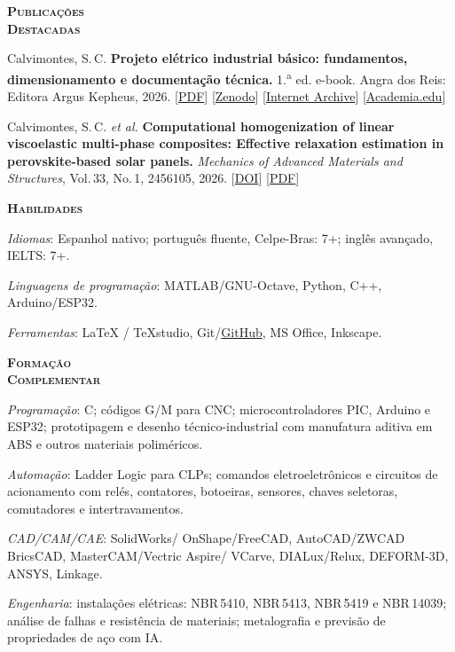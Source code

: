 \documentclass[a4paper, 10pt]{article}
\newcommand{\Calluna}{\rmfamily}
\newcommand{\Courier}{\ttfamily}
\newlength{\lblwidth}
\newcommand{\sectionBlock}[2]{%
	\par\addvspace{3pt}%
	\noindent%
	\begin{mdframed}[style=cvbox]%
		\noindent%
		\begin{minipage}[t]{\lblwidth}%
			\vspace{0pt}%
			\setstretch{1.0}%
			\raggedright%
			\small\scshape\Calluna%
			#1%
		\end{minipage}%
		\hspace{6pt}%
		\begin{minipage}[t]{\dimexpr\linewidth-\lblwidth-6pt\relax}%
			\vspace{0pt}%
			\setlength{\parindent}{0pt}%
			\setlength{\parskip}{2pt}%
			#2%
		\end{minipage}%
	\end{mdframed}%
	\par\addvspace{1pt}%
}
\renewcommand{\section}[1]{%
	{\small\bfseries\scshape #1}%
}
\newcommand{\cvBlock}{%
	\justifying%
	\setlength{\parindent}{0pt}%
	\setlength{\parskip}{2pt}%
	\noindent\ignorespaces%
}
\newcommand{\cvLine}[1]{%
	\noindent #1\par\vspace{1pt}%
}
\begin{document}
	\sectionBlock{
		\section{Publicações\\[2pt]Destacadas}
	}{
		\cvBlock
		
		\cvLine{Calvimontes, S.\,C.
			\textbf{Projeto elétrico industrial básico: fundamentos, dimensionamento e documentação técnica.}
			1.\textsuperscript{a} ed. e-book.
			Angra dos Reis: Editora Argus Kepheus, 2026.
			[\href{https://drive.google.com/file/d/1j6KBMzZnQOnWV1OI968__dmG1RZcZ-Jl/view?usp=sharing}{PDF}]
			[\href{https://zenodo.org/records/20804262}{Zenodo}]
			[\href{https://archive.org/details/calvimontes-s.-c.-projeto-eletrico-fundamentos-dimensionamento-e-documentacao-tecnica-2026-1ed-182p}{Internet Archive}]
			[\href{https://www.academia.edu/169042224/Projeto_el\%C3\%A9trico_industrial_b\%C3\%A1sico}{Academia.edu}]}
		
		\cvLine{Calvimontes, S.\,C. \textit{et al.}
			\textbf{Computational homogenization of linear viscoelastic multi-phase composites:
				Effective relaxation estimation in perovskite-based solar panels.}
			\emph{Mechanics of Advanced Materials and Structures},
			Vol.\,33, No.\,1, 2456105, 2026.
			[\href{https://doi.org/10.1080/15376494.2025.2456105}{DOI}]
			[\href{https://drive.google.com/file/d/1LJM0_6I7H_WkGn2Orc6aN3Xmn1YhA52J/view?usp=sharing}{PDF}]}
	}
	
	\sectionBlock{
		\section{Habilidades}
	}{
		\cvBlock
		\cvLine{\emph{Idiomas}: Espanhol nativo; português fluente, Celpe-Bras: 7+; inglês avançado, IELTS: 7+.}
		\cvLine{\emph{Linguagens de programação}: {\Courier MATLAB/GNU-Octave, Python, C++, Arduino/ESP32}.}
		\cvLine{\emph{Ferramentas}: \LaTeX{} / TeXstudio, Git/\href{https://github.com/Argus-Kepheus}{GitHub}, MS Office, Inkscape.}
	}
	
	\sectionBlock{
		\section{Formação\\[2pt]Complementar}
	}{
		\cvBlock
		\cvLine{\emph{Programação}: C; códigos G/M para CNC; microcontroladores PIC, Arduino e ESP32; prototipagem e desenho técnico-industrial com manufatura aditiva em ABS e outros materiais poliméricos.}
		\cvLine{\emph{Automação}: Ladder Logic para CLPs; comandos eletroeletrônicos e circuitos de acionamento com relés, contatores, botoeiras, sensores, chaves seletoras, comutadores e intertravamentos.}
		\cvLine{\emph{CAD/CAM/CAE}: SolidWorks/ OnShape/FreeCAD, AutoCAD/ZWCAD BricsCAD, MasterCAM/Vectric Aspire/ VCarve, DIALux/Relux, DEFORM-3D, ANSYS, Linkage.}
		\cvLine{\emph{Engenharia}: instalações elétricas: NBR\,5410, NBR\,5413, NBR\,5419 e NBR\,14039;
			análise de falhas e resistência de materiais; metalografia e previsão de propriedades de aço com IA.}
	}
	
\end{document}
